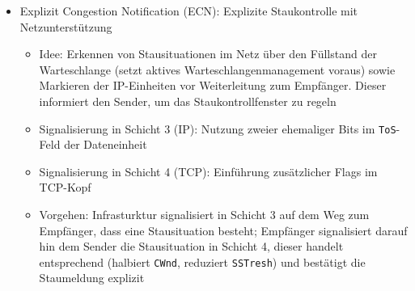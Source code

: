 \begin{itemize}
\begin{itemize}
		\item Explizit Congestion Notification (ECN): Explizite Staukontrolle mit Netzunterstützung
		\begin{itemize}
			\item Idee: Erkennen von Stausituationen im Netz über den Füllstand der Warteschlange (setzt aktives Warteschlangenmanagement voraus) sowie Markieren der IP-Einheiten vor Weiterleitung zum Empfänger. Dieser informiert den Sender, um das Staukontrollfenster zu regeln
			\item Signalisierung in Schicht 3 (IP): Nutzung zweier ehemaliger Bits im \texttt{ToS}-Feld der Dateneinheit
			\item Signalisierung in Schicht 4 (TCP): Einführung zusätzlicher Flags im TCP-Kopf
			\item Vorgehen: Infrasturktur signalisiert in Schicht 3 auf dem Weg zum Empfänger, dass eine Stausituation besteht; Empfänger signalisiert darauf hin dem Sender die Stausituation in Schicht 4, dieser handelt entsprechend (halbiert \texttt{CWnd}, reduziert \texttt{SSTresh}) und bestätigt die Staumeldung explizit
		\end{itemize}
	\end{itemize}
\end{itemize}

